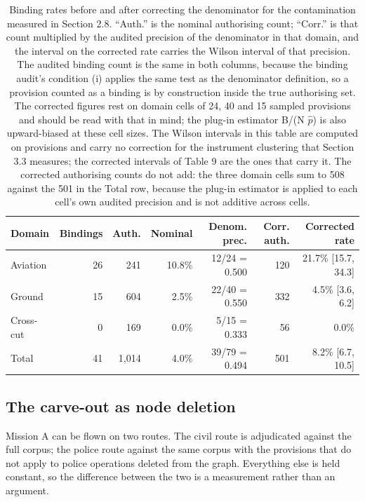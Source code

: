 \begin{table}[!htb]
\centering
\caption{Binding rates before and after correcting the denominator for the contamination measured in Section 2.8. ``Auth.'' is the nominal authorising count; ``Corr.'' is that count multiplied by the audited precision of the denominator in that domain, and the interval on the corrected rate carries the Wilson interval of that precision. The audited binding count is the same in both columns, because the binding audit's condition (i) applies the same test as the denominator definition, so a provision counted as a binding is by construction inside the true authorising set. The corrected figures rest on domain cells of 24, 40 and 15 sampled provisions and should be read with that in mind; the plug-in estimator B/(N $\hat{p}$) is also upward-biased at these cell sizes. The Wilson intervals in this table are computed on provisions and carry no correction for the instrument clustering that Section 3.3 measures; the corrected intervals of Table 9 are the ones that carry it. The corrected authorising counts do not add: the three domain cells sum to 508 against the 501 in the Total row, because the plug-in estimator is applied to each cell's own audited precision and is not additive across cells.}
\label{tab:t4}
\small
\begin{tabular}{@{}lrrrrrr@{}}
\toprule
Domain & Bindings & Auth. & Nominal & Denom. prec. & Corr. auth. & Corrected rate \\
\midrule
Aviation & 26 & 241 & 10.8\% & 12/24 = 0.500 & 120 & 21.7\% [15.7, 34.3] \\
Ground & 15 & 604 & 2.5\% & 22/40 = 0.550 & 332 & 4.5\% [3.6, 6.2] \\
Cross-cut & 0 & 169 & 0.0\% & 5/15 = 0.333 & 56 & 0.0\% \\
Total & 41 & 1,014 & 4.0\% & 39/79 = 0.494 & 501 & 8.2\% [6.7, 10.5] \\
\bottomrule
\end{tabular}
\end{table}

\subsection{The carve-out as node deletion}\label{sec:2.9}

Mission A can be flown on two routes. The civil route is adjudicated against the full corpus; the police route against the same corpus with the provisions that do not apply to police operations deleted from the graph. Everything else is held constant, so the difference between the two is a measurement rather than an argument.

